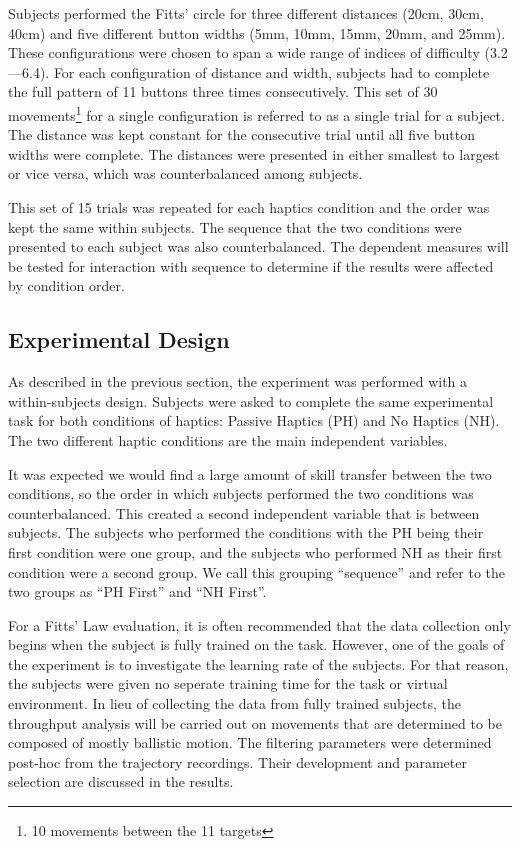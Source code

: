Subjects performed the Fitts' circle for three different distances (20cm, 30cm, 40cm) and five different button widths (5mm, 10mm, 15mm, 20mm, and 25mm).
These configurations were chosen to span a wide range of indices of difficulty (3.2---6.4).
For each configuration of distance and width, subjects had to complete the full pattern of 11 buttons three times consecutively.
This set of 30 movements\footnote{10 movements between the 11 targets} for a single configuration is referred to as a single trial for a subject.
The distance was kept constant for the consecutive trial until all five button widths were complete.
The distances were presented in either smallest to largest or vice versa, which was counterbalanced among subjects.

This set of 15 trials was repeated for each haptics condition and the order was kept the same within subjects.
The sequence that the two conditions were presented to each subject was also counterbalanced.
The dependent measures will be tested for interaction with sequence to determine if the results were affected by condition order.

\subsection{Experimental Design}

As described in the previous section, the experiment was performed with a within-subjects design.
Subjects were asked to complete the same experimental task for both conditions of haptics: Passive Haptics (PH) and No Haptics (NH).
The two different haptic conditions are the main independent variables.

It was expected we would find a large amount of skill transfer between the two conditions, so the order in which subjects performed the two conditions was counterbalanced.
This created a second independent variable that is between subjects.
The subjects who performed the conditions with the PH being their first condition were one group, and the subjects who performed NH as their first condition were a second group.
We call this grouping ``sequence'' and refer to the two groups as ``PH First'' and ``NH First''.

For a Fitts' Law evaluation, it is often recommended that the data collection only begins when the subject is fully trained on the task.
However, one of the goals of the experiment is to investigate the learning rate of the subjects.
For that reason, the subjects were given no seperate training time for the task or virtual environment.
In lieu of collecting the data from fully trained subjects, the throughput analysis will be carried out on movements that are determined to be composed of mostly ballistic motion.
The filtering parameters were determined post-hoc from the trajectory recordings.
Their development and parameter selection are discussed in the results.

